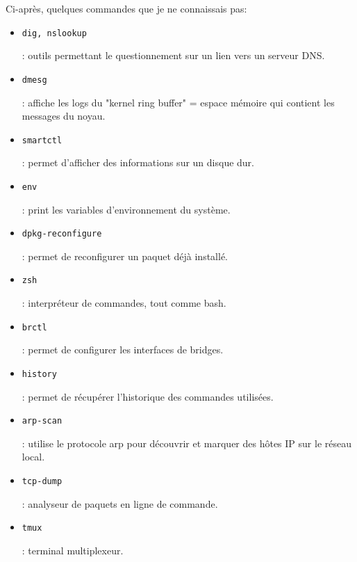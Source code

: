 \documentclass[12pt, a4paper, twoside]{article}
\begin{document}
Ci-après, quelques commandes que je ne connaissais pas:
\begin{itemize}
    \item \begin{code}\texttt{dig, nslookup}\end{code}: outils permettant le questionnement sur un lien vers un serveur \gls{DNS}. 
    \item \begin{code}\texttt{dmesg}\end{code}: affiche les logs du "kernel ring buffer" = espace mémoire qui contient les messages du noyau.
    \item \begin{code}\texttt{smartctl}\end{code}: permet d'afficher des informations sur un disque dur. 
    \item \begin{code}\texttt{env}\end{code}: print les variables d'environnement du système.
    \item \begin{code}\texttt{dpkg-reconfigure}\end{code}: permet de reconfigurer un paquet déjà installé.
    \item \begin{code}\texttt{zsh}\end{code}: interpréteur de commandes, tout comme bash. 
    \item \begin{code}\texttt{brctl}\end{code}: permet de configurer les interfaces de bridges.
    \item \begin{code}\texttt{history}\end{code}: permet de récupérer l'historique des commandes utilisées.
    \item \begin{code}\texttt{arp-scan}\end{code}: utilise le protocole arp pour découvrir et marquer des hôtes \gls{IP} sur le réseau local.
    \item \begin{code}\texttt{tcp-dump}\end{code}: analyseur de paquets en ligne de commande.
    \item \begin{code}\texttt{tmux}\end{code}: terminal multiplexeur.

\end{itemize}
\end{document}

